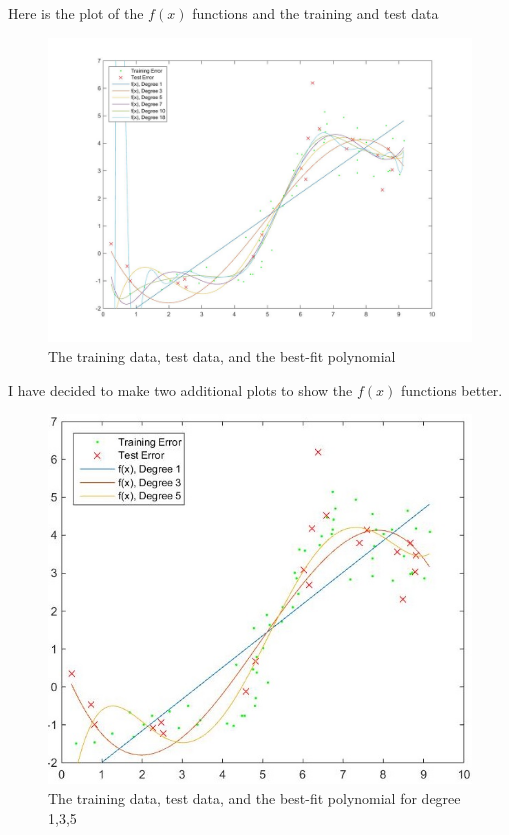 \documentclass[twoside,11pt]{article}
\theoremstyle{definition}
\begin{document}

Here is the plot of the $f(x)$ functions and the training and test data
\begin{figure}[h]
\centering
\includegraphics[width=5 in]{prob1cPlotA.jpg}
\caption{The training data, test data, and the best-fit polynomial}
\end{figure}
\newpage
I have decided to make two additional plots to show the $f(x)$ functions better. 
\begin{figure}[h]
\centering
\includegraphics[height=3 in]{prob1cPlotA_1.jpg}
\caption{The training data, test data, and the best-fit polynomial for degree 1,3,5}
\end{figure}
\end{document}
